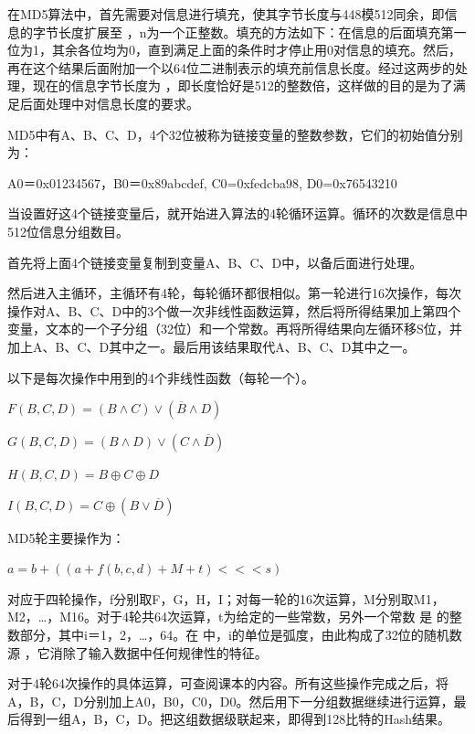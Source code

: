 \documentclass[UTF8,a4paper]{article}
\begin{document}
在MD5算法中，首先需要对信息进行填充，使其字节长度与448模512同余，即信息的字节长度扩展至 ，n为一个正整数。填充的方法如下：在信息的后面填充第一位为1，其余各位均为0，直到满足上面的条件时才停止用0对信息的填充。然后，再在这个结果后面附加一个以64位二进制表示的填充前信息长度。经过这两步的处理，现在的信息字节长度为 ，即长度恰好是512的整数倍，这样做的目的是为了满足后面处理中对信息长度的要求。\par 
MD5中有A、B、C、D，4个32位被称为链接变量的整数参数，它们的初始值分别为：\par 
A0＝0x01234567，B0＝0x89abcdef, C0=0xfedcba98, D0=0x76543210\par 
当设置好这4个链接变量后，就开始进入算法的4轮循环运算。循环的次数是信息中512位信息分组数目。\par 
首先将上面4个链接变量复制到变量A、B、C、D中，以备后面进行处理。\par 
然后进入主循环，主循环有4轮，每轮循环都很相似。第一轮进行16次操作，每次操作对A、B、C、D中的3个做一次非线性函数运算，然后将所得结果加上第四个变量，文本的一个子分组（32位）和一个常数。再将所得结果向左循环移S位，并加上A、B、C、D其中之一。最后用该结果取代A、B、C、D其中之一。\par 
 以下是每次操作中用到的4个非线性函数（每轮一个）。\par 

\begin{centering}
	$ 
	F(B,C,D)=(B\wedge C)\vee(\overline B\wedge D)
	$\par 
	$
		G(B,C,D)=(B\wedge D)\vee(C\wedge \overline D)
	$\par 
	$
		H(B,C,D)=B\oplus C\oplus D
	$\par 	
	$
		I(B,C,D)=C\oplus ( B\vee\overline D)
	$\par 
	
	\end{centering}

 MD5轮主要操作为：\par 
\begin{centering}
$a=b+((a+f(b,c,d)+M+t)<<<s)$



	\end{centering}
  对应于四轮操作，f分别取F，G，H，I；对每一轮的16次运算，M分别取M1，M2，…，M16。对于4轮共64次运算，t为给定的一些常数，另外一个常数 是 的整数部分，其中i＝1，2，…，64。在 中，i的单位是弧度，由此构成了32位的随机数源 ，它消除了输入数据中任何规律性的特征。\par 
对于4轮64次操作的具体运算，可查阅课本的内容。所有这些操作完成之后，将A，B，C，D分别加上A0，B0，C0，D0。然后用下一分组数据继续进行运算，最后得到一组A，B，C，D。把这组数据级联起来，即得到128比特的Hash结果。\par 
\end{document}
